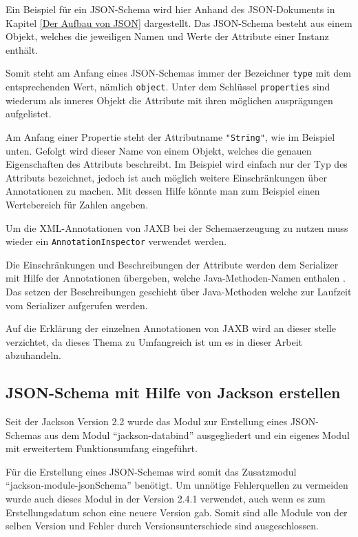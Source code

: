 Ein Beispiel f\"ur ein JSON-Schema wird hier Anhand des JSON-Dokuments in Kapitel \ref{Der Aufbau von JSON} dargestellt.
Das JSON-Schema besteht aus einem Objekt, welches die jeweiligen Namen und Werte der Attribute einer Instanz enth\"alt.

Somit steht am Anfang eines JSON-Schemas immer der Bezeichner \texttt{type} mit dem entsprechenden Wert, n\"amlich \texttt{object}.
Unter dem Schl\"ussel \texttt{properties} sind wiederum als inneres Objekt die Attribute mit ihren m\"oglichen auspr\"agungen aufgelistet. 

Am Anfang einer Propertie steht der Attributname \texttt{"}\texttt{String"}, wie im Beispiel unten.
Gefolgt wird dieser Name von einem Objekt, welches die genauen Eigenschaften des Attributs beschreibt.
Im Beispiel wird einfach nur der Typ des Attributs bezeichnet, jedoch ist auch m\"oglich weitere Einschr\"ankungen \"uber Annotationen zu machen. Mit dessen Hilfe k\"onnte man zum Beispiel einen Wertebereich f\"ur Zahlen angeben.

Um die XML-Annotationen von JAXB bei der Schemaerzeugung zu nutzen muss wieder ein \texttt{AnnotationInspector} verwendet werden.

Die Einschr\"ankungen und Beschreibungen der Attribute werden dem Serializer mit Hilfe der Annotationen \"ubergeben, welche Java-Methoden-Namen enthalen . Das setzen der Beschreibungen geschieht \"uber Java-Methoden welche zur Laufzeit vom Serializer aufgerufen werden.

Auf die Erkl\"arung der einzelnen Annotationen von JAXB wird an dieser stelle verzichtet, da dieses Thema zu Umfangreich ist um es in dieser Arbeit abzuhandeln. 



\subsection{JSON-Schema mit Hilfe von Jackson erstellen}
Seit der Jackson Version 2.2 wurde das Modul zur Erstellung eines JSON-Schemas aus dem Modul "`jackson-databind"' ausgegliedert und ein eigenes Modul mit erweitertem Funktionsumfang eingef\"uhrt. 

F\"ur die Erstellung eines JSON-Schemas wird somit das Zusatzmodul \\"`jackson-module-jsonSchema"' ben\"otigt. Um unn\"otige Fehlerquellen zu vermeiden wurde auch dieses Modul in der Version 2.4.1 verwendet, auch wenn es zum Erstellungsdatum schon eine neuere Version gab. Somit sind alle Module von der selben Version und Fehler durch Versionsunterschiede sind ausgeschlossen.

